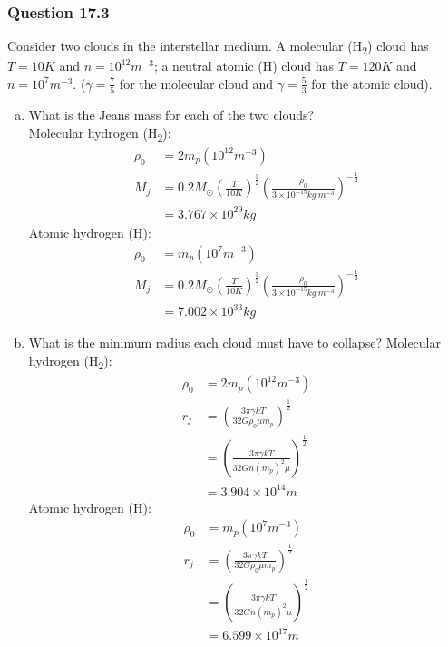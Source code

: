 \documentclass{math}
\begin{document}
\subsubsection*{Question 17.3}
Consider two clouds in the interstellar medium. A molecular (H\textsubscript{2})
cloud has \( T = 10K \) and \( n = 10^{12}m^{-3} \); a neutral atomic (H) cloud
has \( T = 120K \) and \( n = 10^7m^{-3} \). (\( \gamma = \frac{7}{5} \) for
the molecular cloud and \( \gamma = \frac{5}{3} \) for the atomic cloud).
\begin{enumerate}[(a)]
  \item What is the Jeans mass for each of the two clouds? \\
  Molecular hydrogen (H\textsubscript{2}):
  \begin{align*}
    \rho_{0} &= 2m_p(10^{12}m^{-3}) \\
    M_j &= 0.2M_{\odot}\left(\frac{T}{10K}\right)^{\frac{3}{2}}
      \left(\frac{\rho_0}{3\times10^{-15}kg~m^{-3}}\right)^{-\frac{1}{2}} \\
    &= 3.767\times10^{29}kg
  \end{align*}
  Atomic hydrogen (H):
  \begin{align*}
    \rho_{0} &= m_p(10^7m^{-3}) \\
    M_j &= 0.2M_{\odot}\left(\frac{T}{10K}\right)^{\frac{3}{2}}
      \left(\frac{\rho_0}{3\times10^{-15}kg~m^{-3}}\right)^{-\frac{1}{2}} \\
    &= 7.002\times10^{33}kg
  \end{align*}
  \item What is the minimum radius each cloud must have to collapse?
  Molecular hydrogen (H\textsubscript{2}):
  \begin{align*}
    \rho_{0} &= 2m_p(10^{12}m^{-3}) \\
    r_j &= \left(\frac{3\pi\gamma kT}{32G\rho_0\mu m_p}\right)^{\frac{1}{2}} \\
    &= \left(\frac{3\pi\gamma kT}{32Gn(m_p)^2\mu}\right)^{\frac{1}{2}} \\
    &= 3.904\times10^{14}m
  \end{align*}
  Atomic hydrogen (H):
  \begin{align*}
    \rho_{0} &= m_p(10^7m^{-3}) \\
    r_j &= \left(\frac{3\pi\gamma kT}{32G\rho_0\mu m_p}\right)^{\frac{1}{2}} \\
    &= \left(\frac{3\pi\gamma kT}{32Gn(m_p)^2\mu}\right)^{\frac{1}{2}} \\
    &= 6.599\times10^{17}m
  \end{align*}

\end{enumerate}
\end{document}
